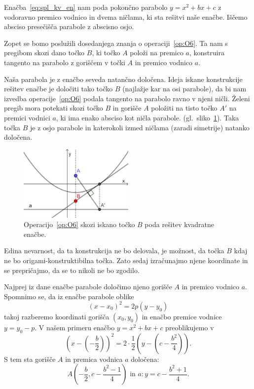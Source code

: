 Enačba~\ref{eq:spl_kv_en} nam poda pokončno parabolo $y = x^2 + bx + c$ z vodoravno premico vodnico in dvema ničlama, ki sta rešitvi naše enačbe. Iščemo absciso presečišča parabole z abscisno osjo.

Zopet se bomo poslužili dosedanjega znanja o operaciji~\ref{op:O6}. Ta nam s pregibom skozi dano točko $B$, ki točko $A$ položi na premico $a$, konstruira tangento na parabolo z goriščem v točki $A$ in premico vodnico $a$.

Naša parabola je z enačbo seveda natančno določena. Ideja iskane konstrukcije rešitev enačbe je določiti tako točko $B$ (najlažje kar na osi parabole), da bi nam izvedba operacije~\ref{op:O6} podala tangento na parabolo ravno v njeni ničli. Želeni pregib mora potekati skozi točko $B$ in gorišče $A$ položiti na tisto točko $A'$ na premici vodnici $a$, ki ima enako absciso kot ničla parabole. (gl.\ sliko~\ref{fig:tockaB_in_O6}). Taka točka $B$ je z osjo parabole in katerokoli izmed ničlama (zaradi simetrije) natanko določena.

\begin{figure}[h]
    \centering
    \includegraphics[width=0.5\textwidth]{images/kvadratna_enacba/tockaB_in_O6.png}
    \caption[Iskanje točke $B$]{Operacijo~\ref{op:O6} skozi iskano točko $B$ poda rešitev kvadratne enačbe.}
    \label{fig:tockaB_in_O6}
\end{figure}

Edina nevarnost, da ta konstrukcija ne bo delovala, je možnost, da točka $B$ kdaj ne bo origami-konstruktibilna točka. Zato sedaj izračunajmo njene koordinate in se prepričajmo, da se to nikoli ne bo zgodilo.

Najprej iz dane enačbe parabole določimo njeno gorišče $A$ in premico vodnico $a$. Spomnimo se, da iz enačbe parabole oblike
$$ (x - x_0)^2 = 2p(y - y_0) $$
takoj razberemo koordinati gorišča $(x_0, y_0)$ in enačbo premice vodnice $y = y_0 - p$. V našem primeru enačbo $y = x^2 + bx + c$ preoblikujemo v
$$ \left(x-\left(-\frac{b}{2}\right)\right)^2 = 2 \cdot \frac{1}{2} \left(y - \left(c - \frac{b^2}{4}\right)\right). $$
S tem sta gorišče $A$ in premica vodnica $a$ določena:
$$ A\left(-\frac{b}{2}, c - \frac{b^2 - 1}{4}\right) \text{ in } a: y = c - \frac{b^2 + 1}{4}. $$

